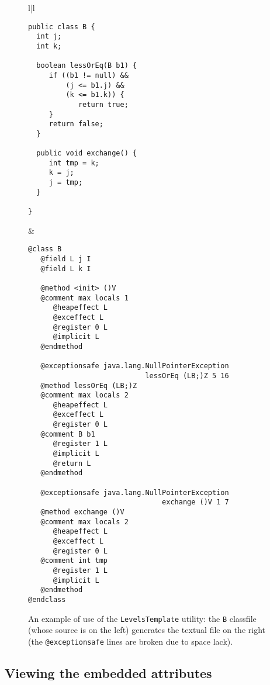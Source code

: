 \documentclass [a4paper,twoside]{article}
\begin{document}
\begin{figure}[htbp]
  \centering
  \begin{small}
  \begin{tabular}{l|l}

  \begin{minipage}{150pt}
\lstset{language=Java, keywordstyle=\rmfamily\bfseries}
    \begin{lstlisting}
public class B {
  int j;
  int k;
    
  boolean lessOrEq(B b1) {
     if ((b1 != null) && 
         (j <= b1.j) && 
         (k <= b1.k)) {
            return true;
     }
     return false;
  }
    
  public void exchange() { 
     int tmp = k; 
     k = j;
     j = tmp;
  }
    
}
\end{lstlisting}
  \end{minipage}
&
    \begin{minipage}{180pt}
\begin{verbatim}
@class B
   @field L j I
   @field L k I

   @method <init> ()V
   @comment max locals 1
      @heapeffect L
      @exceffect L
      @register 0 L
      @implicit L
   @endmethod

   @exceptionsafe java.lang.NullPointerException 
                            lessOrEq (LB;)Z 5 16
   @method lessOrEq (LB;)Z
   @comment max locals 2
      @heapeffect L
      @exceffect L
      @register 0 L
   @comment B b1
      @register 1 L
      @implicit L
      @return L
   @endmethod

   @exceptionsafe java.lang.NullPointerException 
                                exchange ()V 1 7
   @method exchange ()V
   @comment max locals 2
      @heapeffect L
      @exceffect L
      @register 0 L
   @comment int tmp
      @register 1 L
      @implicit L
   @endmethod
@endclass
\end{verbatim}
  \end{minipage}
\end{tabular}
\end{small}
\caption{An example of use of the  \texttt{LevelsTemplate} utility: the 
  \texttt{B} classfile (whose source is on the left) generates the textual 
  file on the right (the \texttt{@exceptionsafe} lines are broken due to 
  space lack).}
\label{fig:exampletemplate}
\end{figure}


\subsection{Viewing the embedded attributes}
\label{sec:jmlclasslib}
\end{document}
